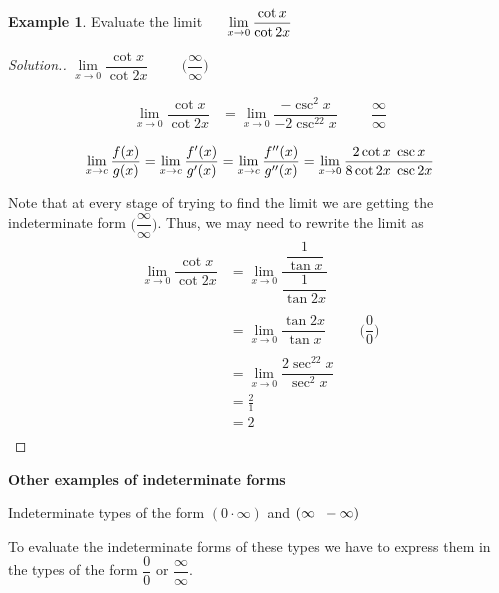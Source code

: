 \documentclass[11pt,a4paper]{article}
\theoremstyle{definition}
\newtheorem{exa}[thm]{Example}
\newenvironment{solution}
  {\renewcommand{\qedsymbol}{}\begin{proof}[\textit{Solution}.]}
  {\end{proof}}
\newcommand{\subhead}[1]{%
  \par\medskip\noindent\textbf{#1}\par\nobreak\smallskip}
\begin{document}
\begin{exa}


Evaluate the limit $\hspace{0.5cm}\lim\limits_{x\rightarrow 0} \dfrac{\cot x}{\cot 2x}$
\end{exa}


\begin{solution}


$\lim\limits_{x\rightarrow 0} \dfrac{\cot x}{\cot 2x}\hspace{1cm} \Bigg(\dfrac{\infty}{\infty}\Bigg)$

\begin{align*}
\lim\limits_{x\rightarrow 0} \dfrac{\cot x}{\cot 2x} & = \lim\limits_{x\rightarrow 0}\dfrac{-\csc^2x}{-2\csc^22x}\hspace{1cm} \dfrac{\infty}{\infty}
\end{align*}

$$\lim\limits_{x\rightarrow c}\dfrac{f(x)}{g(x)} = \lim\limits_{x\rightarrow c}\dfrac{f'(x)}{g'(x)}= \lim\limits_{x\rightarrow c}\dfrac{f''(x)}{g''(x)}=\lim\limits_{x\rightarrow 0}\dfrac{2\cot x \hspace{0.1cm}\csc x}{8\cot 2x\hspace{0.1cm}\csc 2x}$$

Note that at every stage of trying to find the limit we are getting the indeterminate form $\Big(\dfrac{\infty}{\infty}\Big)$. Thus, we may need to rewrite the limit as
\begin{align*}
\lim\limits_{x\rightarrow 0}\dfrac{\cot x}{\cot 2x} & = \lim\limits_{x\rightarrow 0}\dfrac{\dfrac{1}{\tan x}}{\dfrac{1}{\tan 2x}}\\\\
& = \lim\limits_{x\rightarrow 0}\dfrac{\tan 2x}{\tan x}\hspace{1cm} \Big(\dfrac{0}{0}\Big)\\\\
& = \lim\limits_{x\rightarrow 0}\dfrac{2\sec^22x}{\sec^2x}\\
& = \frac{2}{1}\\
& = 2\\
\end{align*}
\end{solution}

\subhead{Other examples of indeterminate forms}


Indeterminate types of the form $(0\cdot \infty)$ and $(\infty\hspace{0.2cm}-\infty)$


To evaluate the indeterminate forms of these types we have to express them in the types of the form $\dfrac{0}{0}$ or $\dfrac{\infty}{\infty}$.
\end{document}
